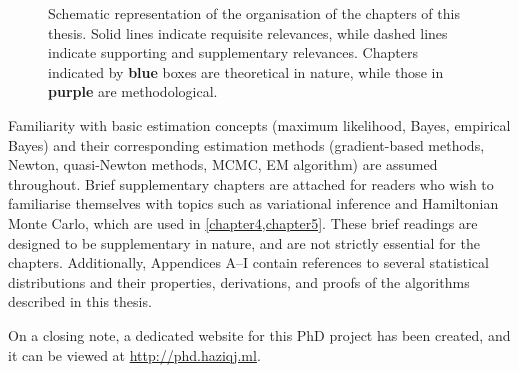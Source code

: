 \documentclass[11pt,twoside,openright,showframe]{report}
\begin{document}
\begin{figure}[hbtp]
  \vspace{0.5em}
  \caption[Schematic representation of the organisation of the chapters of this thesis]{Schematic representation of the organisation of the chapters of this thesis. Solid lines indicate requisite relevances, while dashed lines indicate supporting and supplementary relevances. Chapters indicated by \textbf{\color{lseblu} blue} boxes are theoretical in nature, while those in \textbf{\color{lsedpr} purple} are methodological.}
\end{figure}

Familiarity with basic estimation concepts (maximum likelihood, Bayes, empirical Bayes) and their corresponding estimation methods (gradient-based methods, Newton, quasi-Newton methods, MCMC, EM algorithm) are assumed throughout.
Brief supplementary chapters are attached for readers who wish to familiarise themselves with topics such as variational inference and Hamiltonian Monte Carlo, which are used in \cref{chapter4,chapter5}.
These brief readings are designed to be supplementary in nature, and are not strictly essential for the chapters.
Additionally, Appendices A--I contain references to several statistical distributions and their properties, derivations, and proofs of the algorithms described in this thesis.

On a closing note, a dedicated website for this PhD project has been created, and it can be viewed at \url{http://phd.haziqj.ml}.

\hClosingStuffStandalone
\end{document}
